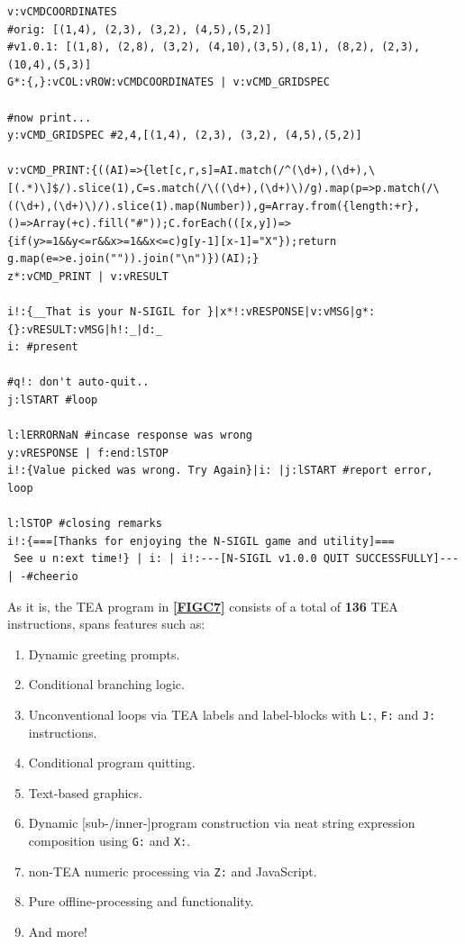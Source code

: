 \documentclass[a4paper, 18pt]{book} %
\begin{document}
\begin{tcolorbox}[teaterminalstyle, title=TEA Program: N-SIGIL image generator program, breakable]
\begin{lstlisting}[language=TEA,breaklines=true]
v:vCMDCOORDINATES
#orig: [(1,4), (2,3), (3,2), (4,5),(5,2)]
#v1.0.1: [(1,8), (2,8), (3,2), (4,10),(3,5),(8,1), (8,2), (2,3), (10,4),(5,3)]
G*:{,}:vCOL:vROW:vCMDCOORDINATES | v:vCMD_GRIDSPEC

#now print...
y:vCMD_GRIDSPEC #2,4,[(1,4), (2,3), (3,2), (4,5),(5,2)]

v:vCMD_PRINT:{((AI)=>{let[c,r,s]=AI.match(/^(\d+),(\d+),\[(.*)\]$/).slice(1),C=s.match(/\((\d+),(\d+)\)/g).map(p=>p.match(/\((\d+),(\d+)\)/).slice(1).map(Number)),g=Array.from({length:+r},()=>Array(+c).fill("#"));C.forEach(([x,y])=>{if(y>=1&&y<=r&&x>=1&&x<=c)g[y-1][x-1]="X"});return g.map(e=>e.join("")).join("\n")})(AI);}
z*:vCMD_PRINT | v:vRESULT

i!:{__That is your N-SIGIL for }|x*!:vRESPONSE|v:vMSG|g*:{}:vRESULT:vMSG|h!:_|d:_
i: #present

#q!: don't auto-quit..
j:lSTART #loop

l:lERRORNaN #incase response was wrong
y:vRESPONSE | f:end:lSTOP
i!:{Value picked was wrong. Try Again}|i: |j:lSTART #report error, loop

l:lSTOP #closing remarks
i!:{===[Thanks for enjoying the N-SIGIL game and utility]===
 See u n:ext time!} | i: | i!:---[N-SIGIL v1.0.0 QUIT SUCCESSFULLY]--- | -#cheerio
   \end{lstlisting}
  \end{tcolorbox}
  \label{FIGC7}
  \vspace{1cm}
  
 \large
 \raggedright %
  
  As it is, the TEA program in \textbf{\autoref{FIGC7}} consists of a total of \textbf{136} TEA instructions, spans features such as:
  
\begin{enumerate}
\item Dynamic greeting prompts.
\item Conditional branching logic.
\item Unconventional loops via TEA labels and label-blocks with \texttt{L:}, \texttt{F:} and \texttt{J:} instructions.
\item Conditional program quitting.
\item Text-based graphics.
\item Dynamic [sub-/inner-]program construction via neat string expression composition using \texttt{G:} and \texttt{X:}.
\item non-TEA numeric processing via \texttt{Z:} and JavaScript.
\item Pure offline-processing and functionality.
\item And more!
\end{enumerate} 
 
\end{document}
